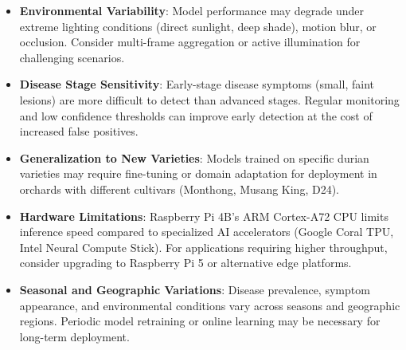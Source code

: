 \begin{itemize}
\item \textbf{Environmental Variability}: Model performance may degrade under extreme lighting conditions (direct sunlight, deep shade), motion blur, or occlusion. Consider multi-frame aggregation or active illumination for challenging scenarios.

\item \textbf{Disease Stage Sensitivity}: Early-stage disease symptoms (small, faint lesions) are more difficult to detect than advanced stages. Regular monitoring and low confidence thresholds can improve early detection at the cost of increased false positives.

\item \textbf{Generalization to New Varieties}: Models trained on specific durian varieties may require fine-tuning or domain adaptation for deployment in orchards with different cultivars (Monthong, Musang King, D24).

\item \textbf{Hardware Limitations}: Raspberry Pi 4B's ARM Cortex-A72 CPU limits inference speed compared to specialized AI accelerators (Google Coral TPU, Intel Neural Compute Stick). For applications requiring higher throughput, consider upgrading to Raspberry Pi 5 or alternative edge platforms.

\item \textbf{Seasonal and Geographic Variations}: Disease prevalence, symptom appearance, and environmental conditions vary across seasons and geographic regions. Periodic model retraining or online learning may be necessary for long-term deployment.
\end{itemize}
